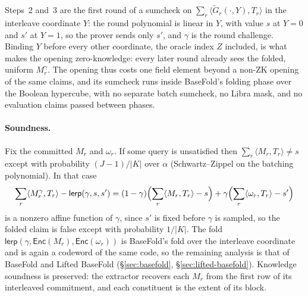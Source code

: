 \documentclass{article}
\theoremstyle{definition}
\newcommand*{\mle}{\widetilde}
\begin{document}
Steps~2 and~3 are the first round of a sumcheck on $\sum_r \langle \mle{G}_r(\cdot, Y), T_r \rangle$ in the interleave coordinate $Y$: the round polynomial is linear in $Y$, with value $s$ at $Y = 0$ and $s'$ at $Y = 1$, so the prover sends only $s'$, and $\gamma$ is the round challenge. Binding $Y$ before every other coordinate, the oracle index $Z$ included, is what makes the opening zero-knowledge: every later round already sees the folded, uniform $M^\gamma_r$. The opening thus costs one field element beyond a non-ZK opening of the same claims, and its sumcheck runs inside BaseFold's folding phase over the Boolean hypercube, with no separate batch sumcheck, no Libra mask, and no evaluation claims passed between phases.

\paragraph{Soundness.}
Fix the committed $M_r$ and $\omega_r$. If some query is unsatisfied then $\sum_r \langle M_r, T_r \rangle \ne s$ except with probability $(J - 1) / |K|$ over $\alpha$ (Schwartz--Zippel on the batching polynomial). In that case
\[
  \sum_r \langle M^\gamma_r, T_r \rangle - \textsf{lerp}(\gamma, s, s') = (1 - \gamma) \Bigl( \sum_r \langle M_r, T_r \rangle - s \Bigr) + \gamma \Bigl( \sum_r \langle \omega_r, T_r \rangle - s' \Bigr)
\]
is a nonzero affine function of $\gamma$, since $s'$ is fixed before $\gamma$ is sampled, so the folded claim is false except with probability $1 / |K|$. The fold $\textsf{lerp}(\gamma, \textsf{Enc}(M_r), \textsf{Enc}(\omega_r))$ is BaseFold's fold over the interleave coordinate and is again a codeword of the same code, so the remaining analysis is that of BaseFold and Lifted BaseFold (\S\ref{sec:basefold}, \S\ref{sec:lifted-basefold}). Knowledge soundness is preserved: the extractor recovers each $M_r$ from the first row of its interleaved commitment, and each constituent is the extent of its block.
\end{document}
